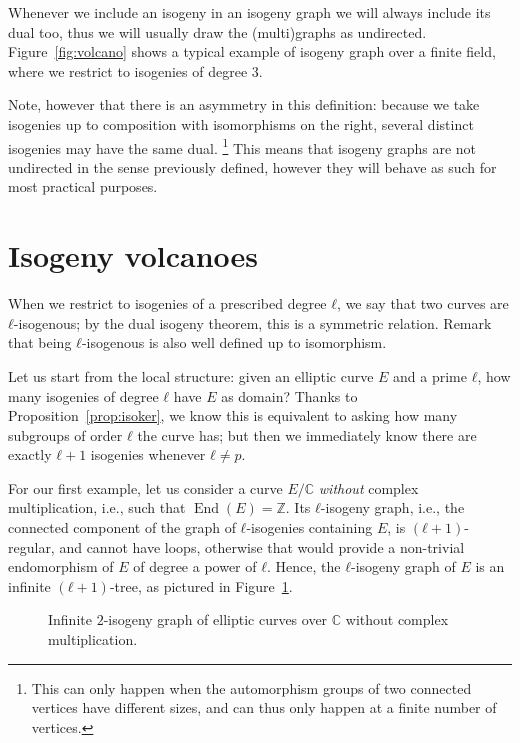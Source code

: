 \documentclass[10pt]{article}
\theoremstyle{plain}
\theoremstyle{definition}
\DeclareMathOperator{\End}{End} %
\begin{document}
Whenever we include an isogeny in an isogeny graph we will always
include its dual too, thus we will usually draw the (multi)graphs as
undirected. %
Figure~\ref{fig:volcano} shows a typical example of isogeny graph over
a finite field, where we restrict to isogenies of degree $3$. %

Note, however that there is an asymmetry in this definition: because
we take isogenies up to composition with isomorphisms on the right,
several distinct isogenies may have the same dual.%
\footnote{This can only happen when the automorphism groups of two
  connected vertices have different sizes, and can thus only happen at
  a finite number of vertices.} %
This means that isogeny graphs are not undirected in the sense
previously defined, however they will behave as such for most
practical purposes. %


\section{Isogeny volcanoes}
\label{sec:ell-isogeny-graphs}

When we restrict to isogenies of a prescribed degree $ℓ$, we say that
two curves are $ℓ$-isogenous; by the dual isogeny theorem, this is a
symmetric relation. %
Remark that being $ℓ$-isogenous is also well defined up to
isomorphism.

Let us start from the local structure: given an elliptic curve $E$ and
a prime $ℓ$, how many isogenies of degree $ℓ$ have $E$ as domain? %
Thanks to Proposition~\ref{prop:isoker}, we know this is equivalent to
asking how many subgroups of order $ℓ$ the curve has; but then we
immediately know there are exactly $ℓ+1$ isogenies whenever $ℓ≠p$.

For our first example, let us consider a curve $E/ℂ$ \emph{without}
complex multiplication, i.e., such that $\End(E)=ℤ$.  %
Its $ℓ$-isogeny graph, i.e., the connected component of the graph of
$ℓ$-isogenies containing $E$, is $(ℓ+1)$-regular, and cannot have
loops, otherwise that would provide a non-trivial endomorphism of $E$
of degree a power of $ℓ$. %
Hence, the $ℓ$-isogeny graph of $E$ is an infinite $(ℓ+1)$-tree, as
pictured in Figure~\ref{fig:infinite-tree}. %

\begin{figure}
  \centering
  
    \caption{Infinite $2$-isogeny graph of elliptic curves over $ℂ$
      without complex multiplication.}
  \label{fig:infinite-tree}
\end{figure}
\end{document}
